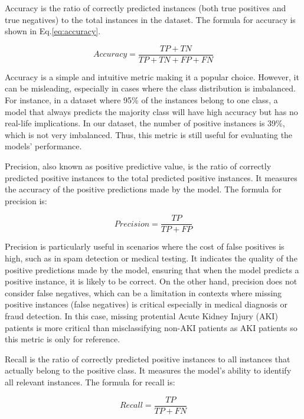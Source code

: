 \documentclass[../main.tex]{subfiles}
\begin{document}
Accuracy is the ratio of correctly predicted instances (both true positives and true negatives) to the total instances in the dataset.
The formula for accuracy is shown in Eq.\ref{eq:accuracy}.

\begin{equation}
    \label{eq:accuracy}
    Accuracy = \frac{TP + TN}{TP + TN + FP + FN}
\end{equation}

Accuracy is a simple and intuitive metric making it a popular choice.
However, it can be misleading, especially in cases where the class distribution is imbalanced.
For instance, in a dataset where 95\% of the instances belong to one class, a model that always predicts the majority class will have high accuracy but has no real-life implications.
In our dataset, the number of positive instances is 39\%, which is not very imbalanced.
Thus, this metric is still useful for evaluating the models' performance.

Precision, also known as positive predictive value, is the ratio of correctly predicted positive instances to the total predicted positive instances. It measures the accuracy of the positive predictions made by the model. The formula for precision is:

\begin{equation}
    \label{eq:precision}
    Precision = \frac{TP}{TP + FP}
\end{equation}

Precision is particularly useful in scenarios where the cost of false positives is high, such as in spam detection or medical testing.
It indicates the quality of the positive predictions made by the model, ensuring that when the model predicts a positive instance, it is likely to be correct.
On the other hand, precision does not consider false negatives, which can be a limitation in contexts where missing positive instances (false negatives) is critical especially in medical diagnosis or fraud detection.
In this case, missing protential Acute Kidney Injury (AKI) patients is more critical than misclassifying non-AKI patients as AKI patients so this metric is only for reference.

Recall is the ratio of correctly predicted positive instances to all instances that actually belong to the positive class.
It measures the model's ability to identify all relevant instances.
The formula for recall is:

\begin{equation}
    \label{eq:recall}
    Recall = \frac{TP}{TP + FN}
\end{equation}
\end{document}
